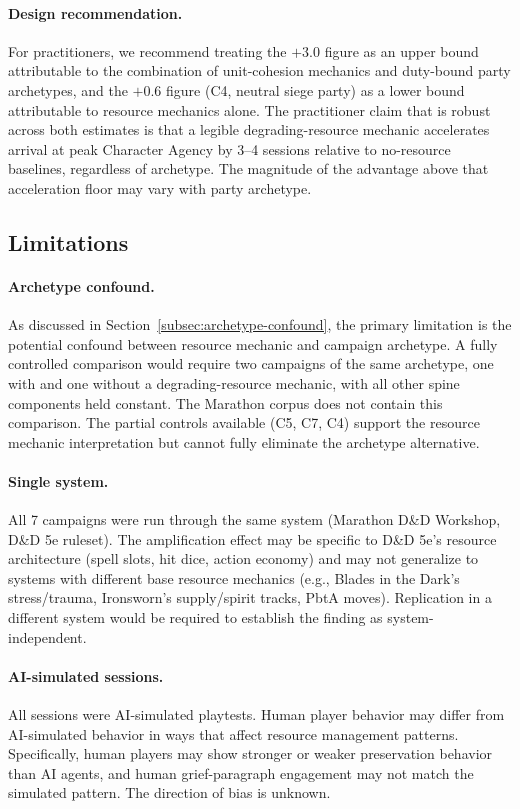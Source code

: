 \paragraph{Design recommendation.}
For practitioners, we recommend treating the $+3.0$ figure as an upper bound
attributable to the combination of unit-cohesion mechanics and duty-bound party
archetypes, and the $+0.6$ figure (C4, neutral siege party) as a lower bound
attributable to resource mechanics alone. The practitioner claim that is robust
across both estimates is that a legible degrading-resource mechanic accelerates
arrival at peak Character Agency by 3--4 sessions relative to no-resource baselines,
regardless of archetype. The magnitude of the advantage above that acceleration floor
may vary with party archetype.

\subsection{Limitations}

\paragraph{Archetype confound.}
As discussed in Section~\ref{subsec:archetype-confound}, the primary limitation is
the potential confound between resource mechanic and campaign archetype. A fully
controlled comparison would require two campaigns of the same archetype, one with and
one without a degrading-resource mechanic, with all other spine components held constant.
The Marathon corpus does not contain this comparison. The partial controls available
(C5, C7, C4) support the resource mechanic interpretation but cannot fully eliminate
the archetype alternative.

\paragraph{Single system.}
All 7 campaigns were run through the same system (Marathon D\&D Workshop, D\&D 5e
ruleset). The amplification effect may be specific to D\&D 5e's resource architecture
(spell slots, hit dice, action economy) and may not generalize to systems with
different base resource mechanics (e.g., Blades in the Dark's stress/trauma,
Ironsworn's supply/spirit tracks, PbtA moves). Replication in a different system
would be required to establish the finding as system-independent.

\paragraph{AI-simulated sessions.}
All sessions were AI-simulated playtests. Human player behavior may differ from
AI-simulated behavior in ways that affect resource management patterns. Specifically,
human players may show stronger or weaker preservation behavior than AI agents, and
human grief-paragraph engagement may not match the simulated pattern. The direction
of bias is unknown.

